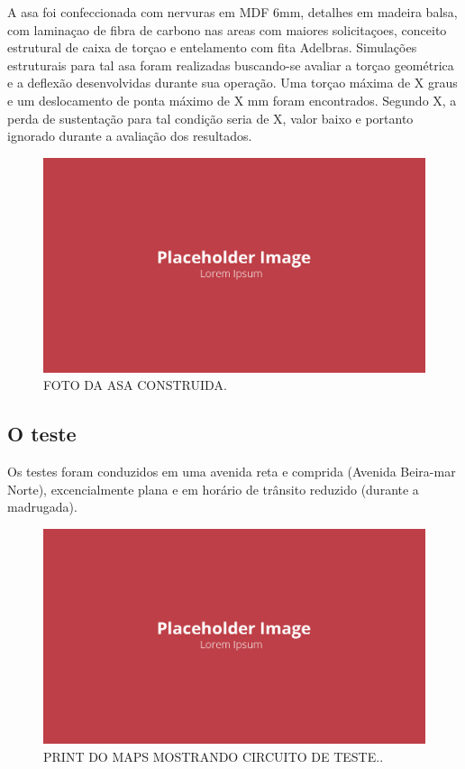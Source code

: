 A asa foi confeccionada com nervuras em MDF 6mm, detalhes em madeira balsa, com laminaçao de fibra de carbono nas areas com maiores solicitaçoes, conceito estrutural de caixa de torçao e entelamento com fita Adelbras. Simulações estruturais para tal asa foram realizadas buscando-se avaliar a torçao geométrica e a deflexão desenvolvidas durante sua operação. Uma torçao máxima de X graus e um deslocamento de ponta máximo de X mm foram encontrados. Segundo X, a perda de sustentação para tal condição seria de X, valor baixo e portanto ignorado durante a avaliação dos resultados.

\begin{figure}[!ht]
    \centering
    \includegraphics[width=.8\linewidth]{figuras/placeholder.png}
    \caption{FOTO DA ASA CONSTRUIDA\cite{autor}.}
    \label{fig:placeholder}
\end{figure}

\subsection{O teste}

Os testes foram conduzidos em uma avenida reta e comprida (Avenida Beira-mar Norte), excencialmente plana e em horário de trânsito reduzido (durante a madrugada).

\begin{figure}[!ht]
    \centering
    \includegraphics[width=.8\linewidth]{figuras/placeholder.png}
    \caption{PRINT DO MAPS MOSTRANDO CIRCUITO DE TESTE.\cite{autor}.}
    \label{fig:placeholder}
\end{figure}

